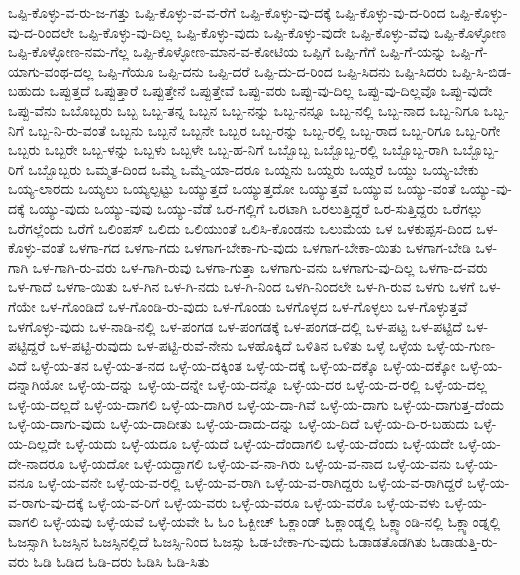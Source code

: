 {ಒಪ್ಪಿ-ಕೊಳ್ಳು-ವ-ರು-ಜ-ಗತ್ತು
ಒಪ್ಪಿ-ಕೊಳ್ಳು-ವ-ವ-ರೆಗೆ
ಒಪ್ಪಿ-ಕೊಳ್ಳು-ವು-ದಕ್ಕೆ
ಒಪ್ಪಿ-ಕೊಳ್ಳು-ವು-ದ-ರಿಂದ
ಒಪ್ಪಿ-ಕೊಳ್ಳು-ವು-ದ-ರಿಂದಲೇ
ಒಪ್ಪಿ-ಕೊಳ್ಳು-ವು-ದಿಲ್ಲ
ಒಪ್ಪಿ-ಕೊಳ್ಳು-ವುದು
ಒಪ್ಪಿ-ಕೊಳ್ಳು-ವುದೇ
ಒಪ್ಪಿ-ಕೊಳ್ಳು-ವೆವು
ಒಪ್ಪಿ-ಕೊಳ್ಳೋಣ
ಒಪ್ಪಿ-ಕೊಳ್ಳೋಣ-ನಮ-ಗೆಲ್ಲ
ಒಪ್ಪಿ-ಕೊಳ್ಳೋಣ-ಮಾನ-ವ-ಕೋಟಿಯ
ಒಪ್ಪಿಗೆ
ಒಪ್ಪಿ-ಗೆಗೆ
ಒಪ್ಪಿ-ಗೆ-ಯನ್ನು
ಒಪ್ಪಿ-ಗೆ-ಯಾಗು-ವಂಥ-ದಲ್ಲ
ಒಪ್ಪಿ-ಗೆಯೂ
ಒಪ್ಪಿ-ದನು
ಒಪ್ಪಿ-ದರೆ
ಒಪ್ಪಿ-ದು-ದ-ರಿಂದ
ಒಪ್ಪಿ-ಸಿದನು
ಒಪ್ಪಿ-ಸಿದರು
ಒಪ್ಪಿ-ಸಿ-ಬಿಡ-ಬಹುದು
ಒಪ್ಪುತ್ತದೆ
ಒಪ್ಪುತ್ತಾರೆ
ಒಪ್ಪುತ್ತೇನೆ
ಒಪ್ಪುತ್ತೇವೆ
ಒಪ್ಪು-ವರು
ಒಪ್ಪು-ವು-ದಿಲ್ಲ
ಒಪ್ಪು-ವು-ದಿಲ್ಲವೊ
ಒಪ್ಪು-ವುದೇ
ಒಪ್ಪು-ವೆನು
ಒಬೊಬ್ಬರು
ಒಬ್ಬ
ಒಬ್ಬ-ತನ್ನ
ಒಬ್ಬನ
ಒಬ್ಬ-ನನ್ನು
ಒಬ್ಬ-ನನ್ನೂ
ಒಬ್ಬ-ನಲ್ಲಿ
ಒಬ್ಬ-ನಾದ
ಒಬ್ಬ-ನಿಗೂ
ಒಬ್ಬ-ನಿಗೆ
ಒಬ್ಬ-ನಿ-ರು-ವಂತೆ
ಒಬ್ಬನು
ಒಬ್ಬನೆ
ಒಬ್ಬನೇ
ಒಬ್ಬರ
ಒಬ್ಬ-ರನ್ನು
ಒಬ್ಬ-ರಲ್ಲಿ
ಒಬ್ಬ-ರಾದ
ಒಬ್ಬ-ರಿಗೂ
ಒಬ್ಬ-ರಿಗೇ
ಒಬ್ಬರು
ಒಬ್ಬರೇ
ಒಬ್ಬ-ಳನ್ನು
ಒಬ್ಬಳು
ಒಬ್ಬಳೇ
ಒಬ್ಬ-ಹ-ನಿಗೆ
ಒಬ್ಬೊಬ್ಬ
ಒಬ್ಬೊಬ್ಬ-ರಲ್ಲಿ
ಒಬ್ಬೊಬ್ಬ-ರಾಗಿ
ಒಬ್ಬೊಬ್ಬ-ರಿಗೆ
ಒಬ್ಬೊಬ್ಬರು
ಒಮ್ಮತ-ದಿಂದ
ಒಮ್ಮೆ
ಒಮ್ಮೆ-ಯಾ-ದರೂ
ಒಯ್ದನು
ಒಯ್ದರು
ಒಯ್ದರೆ
ಒಯ್ದು
ಒಯ್ಯ-ಬೇಕು
ಒಯ್ಯ-ಲಾರದು
ಒಯ್ಯಲು
ಒಯ್ಯಲ್ಪಟ್ಟು
ಒಯ್ಯುತ್ತದೆ
ಒಯ್ಯುತ್ತದೋ
ಒಯ್ಯುತ್ತವೆ
ಒಯ್ಯುವ
ಒಯ್ಯು-ವಂತೆ
ಒಯ್ಯು-ವು-ದಕ್ಕೆ
ಒಯ್ಯು-ವುದು
ಒಯ್ಯು-ವುವು
ಒಯ್ಯು-ವೆಡೆ
ಒರ-ಗಲ್ಲಿಗೆ
ಒರಟಾಗಿ
ಒರಲುತ್ತಿದ್ದರೆ
ಒರ-ಸುತ್ತಿದ್ದರು
ಒರೆಗಲ್ಲು
ಒರೆಗಲ್ಲೆಂದು
ಒರೆಗೆ
ಒಲಿಂಪಸ್
ಒಲಿದು
ಒಲಿಯುಂತೆ
ಒಲಿಸಿ-ಕೊಂಡನು
ಒಲುಮೆಯ
ಒಳ
ಒಳಕುಪ್ಪಸ-ದಿಂದ
ಒಳ-ಕೊಳ್ಳು-ವಂತೆ
ಒಳಗಾ-ಗದ
ಒಳಗಾ-ಗದು
ಒಳಗಾಗ-ಬೇಕಾ-ಗು-ವುದು
ಒಳಗಾಗ-ಬೇಕಾ-ಯಿತು
ಒಳಗಾಗ-ಬೇಡಿ
ಒಳ-ಗಾಗಿ
ಒಳ-ಗಾಗಿ-ರು-ವರು
ಒಳ-ಗಾಗಿ-ರುವು
ಒಳಗಾ-ಗುತ್ತಾ
ಒಳಗಾಗು-ವನು
ಒಳಗಾಗು-ವು-ದಿಲ್ಲ
ಒಳಗಾ-ದ-ವರು
ಒಳ-ಗಾದೆ
ಒಳಗಾ-ಯಿತು
ಒಳ-ಗಿನ
ಒಳ-ಗಿ-ನದು
ಒಳ-ಗಿ-ನಿಂದ
ಒಳಗಿ-ನಿಂದಲೇ
ಒಳ-ಗಿ-ರುವ
ಒಳಗು
ಒಳಗೆ
ಒಳ-ಗೆಯೇ
ಒಳ-ಗೊಂಡಿದೆ
ಒಳ-ಗೊಂಡಿ-ರು-ವುದು
ಒಳ-ಗೊಂಡು
ಒಳಗೊಳ್ಳದ
ಒಳ-ಗೊಳ್ಳಲು
ಒಳ-ಗೊಳ್ಳುತ್ತವೆ
ಒಳಗೊಳ್ಳು-ವುದು
ಒಳ-ನಾಡಿ-ನಲ್ಲಿ
ಒಳ-ಪಂಗಡ
ಒಳ-ಪಂಗಡಕ್ಕೆ
ಒಳ-ಪಂಗಡ-ದಲ್ಲಿ
ಒಳ-ಪಟ್ಟ
ಒಳ-ಪಟ್ಟಿದೆ
ಒಳ-ಪಟ್ಟಿದ್ದರೆ
ಒಳ-ಪಟ್ಟಿ-ರುವುದು
ಒಳ-ಪಟ್ಟಿ-ರುವೆ-ನೇನು
ಒಳಹೊಕ್ಕಿದೆ
ಒಳಿತಿನ
ಒಳಿತು
ಒಳ್ಳೆ
ಒಳ್ಳೆಯ
ಒಳ್ಳೆ-ಯ-ಗುಣ-ವಿದೆ
ಒಳ್ಳೆ-ಯ-ತನ
ಒಳ್ಳೆ-ಯ-ತ-ನದ
ಒಳ್ಳೆ-ಯ-ದಕ್ಕಿಂತ
ಒಳ್ಳೆ-ಯ-ದಕ್ಕೆ
ಒಳ್ಳೆ-ಯ-ದಕ್ಕೊ
ಒಳ್ಳೆ-ಯ-ದಕ್ಕೋ
ಒಳ್ಳೆ-ಯ-ದನ್ನಾಗಿಯೋ
ಒಳ್ಳೆ-ಯ-ದನ್ನು
ಒಳ್ಳೆ-ಯ-ದನ್ನೇ
ಒಳ್ಳೆ-ಯ-ದನ್ನೊ
ಒಳ್ಳೆ-ಯ-ದರ
ಒಳ್ಳೆ-ಯ-ದ-ರಲ್ಲಿ
ಒಳ್ಳೆ-ಯ-ದಲ್ಲ
ಒಳ್ಳೆ-ಯ-ದಲ್ಲದೆ
ಒಳ್ಳೆ-ಯ-ದಾಗಲಿ
ಒಳ್ಳೆ-ಯ-ದಾಗಿರ
ಒಳ್ಳೆ-ಯ-ದಾ-ಗಿವೆ
ಒಳ್ಳೆ-ಯ-ದಾಗು
ಒಳ್ಳೆ-ಯ-ದಾಗುತ್ತ-ದೆಂದು
ಒಳ್ಳೆ-ಯ-ದಾಗು-ವುದು
ಒಳ್ಳೆ-ಯ-ದಾದೀತು
ಒಳ್ಳೆ-ಯ-ದಾದು-ದನ್ನು
ಒಳ್ಳೆ-ಯ-ದಿದೆ
ಒಳ್ಳೆ-ಯ-ದಿ-ರ-ಬಹುದು
ಒಳ್ಳೆ-ಯ-ದಿಲ್ಲದೇ
ಒಳ್ಳೆ-ಯದು
ಒಳ್ಳೆ-ಯದೂ
ಒಳ್ಳೆ-ಯದೆ
ಒಳ್ಳೆ-ಯ-ದೆಂದಾಗಲಿ
ಒಳ್ಳೆ-ಯ-ದೆಂದು
ಒಳ್ಳೆ-ಯದೇ
ಒಳ್ಳೆ-ಯ-ದೇ-ನಾದರೂ
ಒಳ್ಳೆ-ಯದೋ
ಒಳ್ಳೆ-ಯದ್ದಾಗಲಿ
ಒಳ್ಳೆ-ಯ-ವ-ನಾ-ಗಿರು
ಒಳ್ಳೆ-ಯ-ವ-ನಾದ
ಒಳ್ಳೆ-ಯ-ವನು
ಒಳ್ಳೆ-ಯ-ವನೂ
ಒಳ್ಳೆ-ಯ-ವನೇ
ಒಳ್ಳೆ-ಯ-ವ-ರಲ್ಲಿ
ಒಳ್ಳೆ-ಯ-ವ-ರಾಗಿ
ಒಳ್ಳೆ-ಯ-ವ-ರಾಗಿದ್ದರು
ಒಳ್ಳೆ-ಯ-ವ-ರಾಗಿದ್ದರೆ
ಒಳ್ಳೆ-ಯ-ವ-ರಾಗು-ವು-ದಕ್ಕೆ
ಒಳ್ಳೆ-ಯ-ವ-ರಿಗೆ
ಒಳ್ಳೆ-ಯ-ವರು
ಒಳ್ಳೆ-ಯ-ವರೂ
ಒಳ್ಳೆ-ಯ-ವರೊ
ಒಳ್ಳೆ-ಯ-ವಳು
ಒಳ್ಳೆ-ಯ-ವಾಗಲಿ
ಒಳ್ಳೆ-ಯವು
ಒಳ್ಳೆ-ಯವೆ
ಒಳ್ಳೆ-ಯವೇ
ಓ
ಓಂ
ಓಕ್ಬೀಚ್
ಓಕ್ಲಾಂಡ್
ಓಕ್ಲಾಂಡ್ನಲ್ಲಿ
ಓಕ್ಲ್ಯಾಂಡಿ-ನಲ್ಲಿ
ಓಕ್ಲ್ಯಾಂಡ್ನಲ್ಲಿ
ಓಜಸ್ಸಾಗಿ
ಓಜಸ್ಸಿನ
ಓಜಸ್ಸಿನಲ್ಲಿದೆ
ಓಜಸ್ಸಿ-ನಿಂದ
ಓಜಸ್ಸು
ಓಡ-ಬೇಕಾ-ಗು-ವುದು
ಓಡಾಡತೊಡಗಿತು
ಓಡಾಡುತ್ತಿ-ರು-ವರು
ಓಡಿ
ಓಡಿದ
ಓಡಿ-ದರು
ಓಡಿಸಿ
ಓಡಿ-ಸಿತು
}
